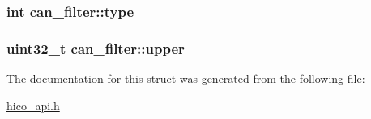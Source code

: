 \subsubsection[{\texorpdfstring{type}{type}}]{\setlength{\rightskip}{0pt plus 5cm}int can\+\_\+filter\+::type}\hypertarget{structcan__filter_a796cdd0845b3b22c44028a898938d3e0}{}\label{structcan__filter_a796cdd0845b3b22c44028a898938d3e0}
\subsubsection[{\texorpdfstring{upper}{upper}}]{\setlength{\rightskip}{0pt plus 5cm}uint32\+\_\+t can\+\_\+filter\+::upper}\hypertarget{structcan__filter_a75039f47394150965764154e50f2f3e1}{}\label{structcan__filter_a75039f47394150965764154e50f2f3e1}


The documentation for this struct was generated from the following file\+:\begin{DoxyCompactItemize}
\item 
\hyperlink{hico__api_8h}{hico\+\_\+api.\+h}\end{DoxyCompactItemize}
